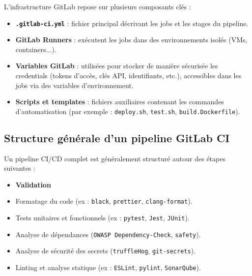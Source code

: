 L’infrastructure GitLab repose sur plusieurs composants clés :
\begin{itemize}
	\item \textbf{\texttt{.gitlab-ci.yml}} : fichier principal décrivant les jobs et les stages du pipeline.
	\item \textbf{GitLab Runners} : exécutent les jobs dans des environnements isolés (VMs, containers...).
	\item \textbf{Variables GitLab} : utilisées pour stocker de manière sécurisée les credentials (tokens d’accès, clés API, identifiants, etc.), accessibles dans les jobs via des variables d’environnement.
	\item \textbf{Scripts et templates} : fichiers auxiliaires contenant les commandes d’automatisation (par exemple : \texttt{deploy.sh}, \texttt{test.sh}, \texttt{build.Dockerfile}).
\end{itemize}

\subsection{Structure générale d’un pipeline GitLab CI}

Un pipeline CI/CD complet est généralement structuré autour des étapes suivantes :

\begin{itemize}
	\item \textbf{Validation}
	\item Formatage du code (ex : \texttt{black}, \texttt{prettier}, \texttt{clang-format}).
	\item Tests unitaires et fonctionnels (ex : \texttt{pytest}, \texttt{Jest}, \texttt{JUnit}).
	\item Analyse de dépendances (\texttt{OWASP Dependency-Check}, \texttt{safety}).
	\item Analyse de sécurité des secrets (\texttt{truffleHog}, \texttt{git-secrets}).
	\item Linting et analyse statique (ex : \texttt{ESLint}, \texttt{pylint}, \texttt{SonarQube}).
\end{itemize}

